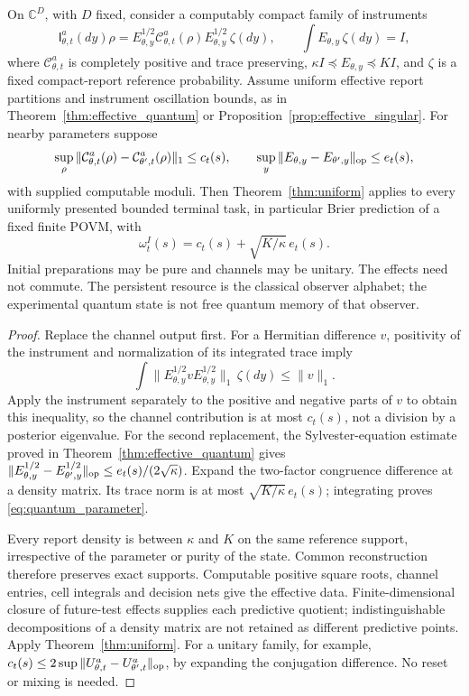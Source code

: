 \begin{theorem}\label{thm:uniform_quantum}
On $\mathbb C^D$, with $D$ fixed, consider a computably compact family of instruments
\[
 \mathsf I_{\theta,t}^a(dy)\rho
   =E_{\theta,y}^{1/2}\mathcal C_{\theta,t}^a(\rho)
                                  E_{\theta,y}^{1/2}\,\zeta(dy),
 \qquad \int E_{\theta,y}\,\zeta(dy)=I,
\]
where $\mathcal C_{\theta,t}^a$ is completely positive and trace preserving,
$\kappa I\preceq E_{\theta,y}\preceq K I$, and $\zeta$ is a fixed compact-report reference probability. Assume uniform effective report partitions and instrument oscillation bounds, as in Theorem~\ref{thm:effective_quantum} or Proposition~\ref{prop:effective_singular}. For nearby parameters suppose
\[
 \sup_{\rho}\|\mathcal C_{\theta,t}^a(\rho)-\mathcal C_{\theta',t}^a(\rho)\|_1
          \le c_t(s),\qquad
 \sup_y\|E_{\theta,y}-E_{\theta',y}\|_{\rm op}\le e_t(s),
\]
with supplied computable moduli. Then Theorem~\ref{thm:uniform} applies to every uniformly presented bounded terminal task, in particular Brier prediction of a fixed finite POVM, with
\begin{equation}\label{eq:quantum_parameter}
              \omega_t^I(s)=c_t(s)+\sqrt{K/\kappa}\,e_t(s).
\end{equation}
Initial preparations may be pure and channels may be unitary. The effects need not commute. The persistent resource is the classical observer alphabet; the experimental quantum state is not free quantum memory of that observer.
\end{theorem}
\begin{proof}
Replace the channel output first. For a Hermitian difference $v$, positivity of the instrument and normalization of its integrated trace imply
\[
 \int\|E_{\theta,y}^{1/2}vE_{\theta,y}^{1/2}\|_1\,\zeta(dy)\le\|v\|_1.
\]
Apply the instrument separately to the positive and negative parts of $v$ to obtain this inequality, so the channel contribution is at most $c_t(s)$, not a division by a posterior eigenvalue. For the second replacement, the Sylvester-equation estimate proved in Theorem~\ref{thm:effective_quantum} gives
$\|E_{\theta,y}^{1/2}-E_{\theta',y}^{1/2}\|_{\rm op}
 \le e_t(s)/(2\sqrt\kappa)$.
Expand the two-factor congruence difference at a density matrix. Its trace norm is at most $\sqrt{K/\kappa}\,e_t(s)$; integrating proves \eqref{eq:quantum_parameter}.

Every report density is between $\kappa$ and $K$ on the same reference support, irrespective of the parameter or purity of the state. Common reconstruction therefore preserves exact supports. Computable positive square roots, channel entries, cell integrals and decision nets give the effective data. Finite-dimensional closure of future-test effects supplies each predictive quotient; indistinguishable decompositions of a density matrix are not retained as different predictive points. Apply Theorem~\ref{thm:uniform}. For a unitary family, for example, $c_t(s)\le2\sup\|U_{\theta,t}^a-U_{\theta',t}^a\|_{\rm op}$, by expanding the conjugation difference. No reset or mixing is needed.
\end{proof}


